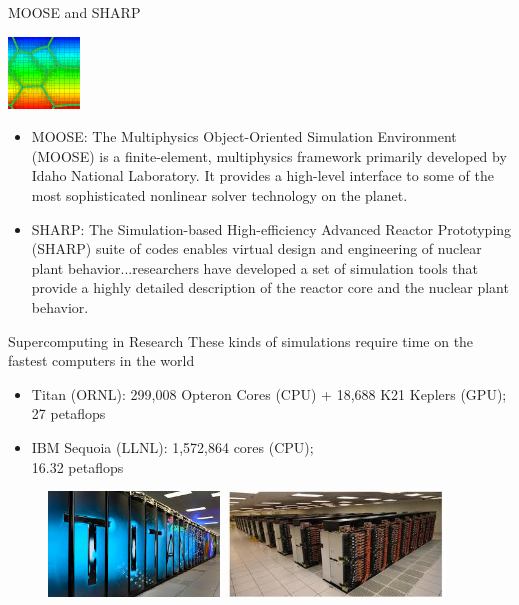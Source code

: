 \documentclass[xcolor=x11names,compress]{beamer}
\renewcommand{\(}{\begin{columns}}
\renewcommand{\)}{\end{columns}}
\newcommand{\<}[1]{\begin{column}{#1}}
\renewcommand{\>}{\end{column}}
\begin{document}
\begin{frame}{MOOSE and SHARP}
\begin{center}
\includegraphics[height=0.75in,clip]{moose}
\end{center}
\begin{itemize}
\item \textcolor{RawSienna}{MOOSE}: The Multiphysics Object-Oriented Simulation Environment (MOOSE) is a finite-element, multiphysics framework primarily developed by Idaho National Laboratory. It provides a high-level interface to some of the most sophisticated nonlinear solver technology on the planet.
\item \textcolor{RawSienna}{SHARP}: The Simulation-based High-efficiency Advanced Reactor Prototyping (SHARP) suite of codes enables virtual design and engineering of nuclear plant behavior...researchers have developed a set of simulation tools that provide a highly detailed description of the reactor core and the nuclear plant behavior. 
\end{itemize}
\end{frame}

\begin{frame}{Supercomputing in Research}
These kinds of simulations require time on the fastest computers in the world
\begin{itemize}
\item \textcolor{RawSienna}{Titan} (ORNL): 299,008 Opteron Cores (CPU) + 18,688 K21 Keplers (GPU); \textcolor{dgreen}{27 petaflops}
\item \textcolor{RawSienna}{IBM Sequoia} (LLNL): 1,572,864 cores (CPU); \\\textcolor{dgreen}{16.32 petaflops}
\end{itemize}
\begin{figure}
\includegraphics[height=1.1in,clip]{Titan}
\hfill
\includegraphics[height=1.1in,clip]{Sequoia}
\end{figure}
\end{frame}
\end{document}
